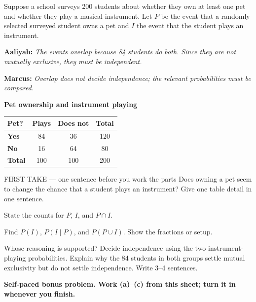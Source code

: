 \documentclass[14pt]{extarticle}
\begin{document}
\pagestyle{empty}


\noindent\begin{minipage}[t]{0.57\linewidth}
\vspace{0pt}
Suppose a school surveys 200 students about whether they own at least one pet and whether they play a musical instrument. Let $P$ be the event that a randomly selected surveyed student owns a pet and $I$ the event that the student plays an instrument.\par\smallskip \textbf{Aaliyah:} \emph{The events overlap because 84 students do both. Since they are not mutually exclusive, they must be independent.}\par \textbf{Marcus:} \emph{Overlap does not decide independence; the relevant probabilities must be compared.}\par
\end{minipage}\hfill
\begin{minipage}[t]{0.40\linewidth}
\vspace{0pt}
\begin{center}
\textbf{Pet ownership and instrument playing}\par\smallskip
\begin{tabular}{|l|c|c|c|}
\hline
\textbf{Pet?} & \textbf{Plays} & \textbf{Does not} & \textbf{Total} \\ \hline
\textbf{Yes} & 84 & 36 & 120 \\ \hline
\textbf{No} & 16 & 64 & 80 \\ \hline
\textbf{Total} & 100 & 100 & 200 \\ \hline
\end{tabular}
\end{center}
\end{minipage}

\begin{firsttakebox}{FIRST TAKE --- one sentence before you work the parts}
Does owning a pet seem to change the chance that a student plays an instrument? Give one table detail in one sentence.
\end{firsttakebox}

\begin{description}[leftmargin=1.15in, labelwidth=1in, itemsep=2pt, topsep=2pt]
  \item[\dokbadge{1}~(a)] State the counts for $P$, $I$, and $P\cap I$.
  \item[\dokbadge{2}~(b)] Find $P(I)$, $P(I\mid P)$, and $P(P\cup I)$. Show the fractions or setup.
  \item[\dokbadge{3}~(c)] Whose reasoning is supported? Decide independence using the two instrument-playing probabilities. Explain why the 84 students in both groups settle mutual exclusivity but do not settle independence. Write 3--4 sentences.
\end{description}

\vfill
\textbf{Self-paced bonus problem. Work (a)--(c) from this sheet; turn it in whenever you finish.}
\end{document}
